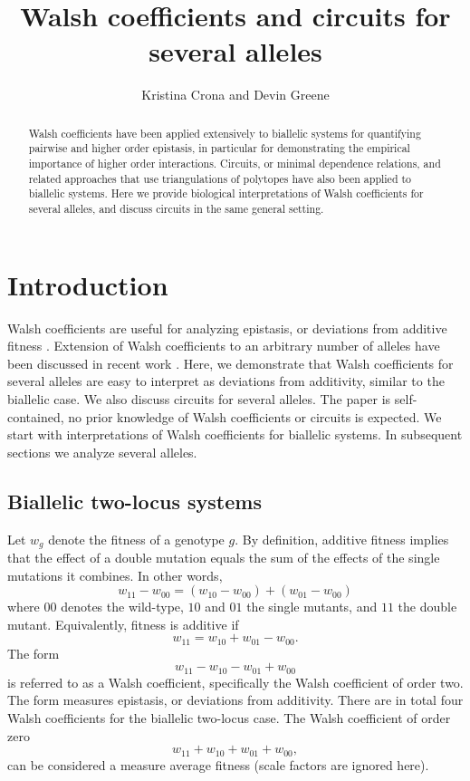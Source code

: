 \documentclass[12pt]{amsart}
\title{Walsh coefficients and circuits for several alleles}
\author{Kristina Crona and Devin Greene}
\theoremstyle{plain}
\theoremstyle{definition}
\begin{document}
\maketitle




\begin{abstract}
Walsh coefficients have been applied extensively 
to biallelic systems for quantifying 
pairwise and higher order epistasis,
in particular for demonstrating
the empirical importance of
higher order interactions.
Circuits, or minimal dependence 
relations, 
and related approaches
that use triangulations
of polytopes
have also been applied
to biallelic systems.
Here we 
provide biological interpretations of
Walsh coefficients for several alleles,
and discuss circuits in the same general
setting.
\end{abstract}





\section{Introduction}
Walsh coefficients are useful for analyzing epistasis,
or deviations from additive fitness \citep{wlw}.
Extension of Walsh coefficients
to an arbitrary number of alleles
have been discussed in recent work \citep{gs, mps, flm}.
Here, we demonstrate that
Walsh coefficients for several
alleles are easy to interpret
as deviations from additivity,
similar to the biallelic case.
We also discuss circuits  \citep{bps} for 
several alleles.
The paper is self-contained,
no prior knowledge of Walsh coefficients
or circuits is expected.
We start with  interpretations of Walsh coefficients
for biallelic systems. 
In subsequent sections
we analyze several alleles.



\subsection{Biallelic two-locus systems}
Let $w_g$ denote the fitness of a genotype $g$.
By definition, additive fitness
implies that the effect of a double mutation
equals  the sum of the effects of the single mutations it combines.
In other words,
\begin{equation}
w_{11}-w_{00}=(w_{10}-w_{00})+(w_{01}-w_{00})  \label{c0}
\end{equation}
where $00$ denotes the wild-type,
$10$ and $01$ the single mutants,
and $11$ the double mutant.
Equivalently, fitness is additive if
\[
w_{11}=w_{10}+w_{01}-w_{00}.
\]
The form
\[
w_{11}-w_{10}-w_{01}+w_{00}
\]
is referred to as a Walsh coefficient, specifically
the Walsh coefficient of order two.
The form measures epistasis, or
deviations from additivity.
There are in total four Walsh coefficients for the
biallelic two-locus case.
The Walsh coefficient of order zero 
\[
w_{11}+w_{10}+w_{01}+w_{00},
\]
 can be considered a  measure average fitness
(scale factors are ignored here).
\end{document}
